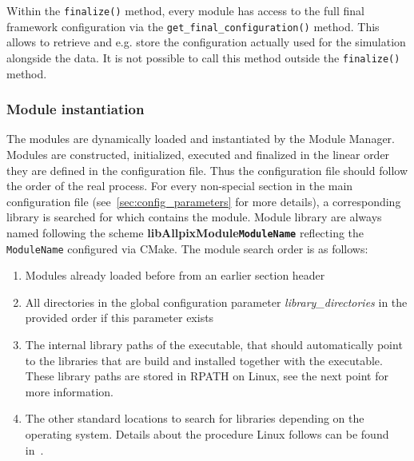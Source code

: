 Within the \texttt{finalize()} method, every module has access to the full final framework configuration via the \texttt{get\_final\_configuration()} method.
This allows to retrieve and e.g. store the configuration actually used for the simulation alongside the data.
It is not possible to call this method outside the \texttt{finalize()} method.

\subsubsection{Module instantiation}
\label{sec:module_instantiation}
The modules are dynamically loaded and instantiated by the Module Manager.
Modules are constructed, initialized, executed and finalized in the linear order they are defined in the configuration file.
Thus the configuration file should follow the order of the real process.
For every non-special section in the main configuration file (see~\ref{sec:config_parameters} for more details), a corresponding library is searched for which contains the module.
Module library are always named following the scheme \textbf{libAllpixModule\texttt{ModuleName}} reflecting the \texttt{ModuleName} configured via CMake.
The module search order is as follows:
\begin{enumerate}
\item Modules already loaded before from an earlier section header
\item All directories in the global configuration parameter \textit{library\_directories} in the provided order if this parameter exists
\item The internal library paths of the executable, that should automatically point to the libraries that are build and installed together with the executable.
These library paths are stored in RPATH on Linux, see the next point for more information.
\item The other standard locations to search for libraries depending on the operating system.
Details about the procedure Linux follows can be found in~\cite{linuxld}.
\end{enumerate}

